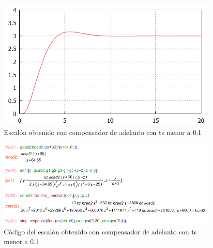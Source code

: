 \documentclass[12pt,letterpaper]{article}
\begin{document}
\begin{figure}[H]
            \centering
            \centerline{\includegraphics[width=125mm]{RLadel3.png}}
            \caption{Escalón obtenido con compensador de adelanto con ts menor a 0.1}
            \label{RLadel3}
\end{figure}

\begin{figure}[H]
            \centering
            \centerline{\includegraphics[width=150mm]{RLadelcode3.png}}
            \caption{Código del escalón obtenido con compensador de adelanto con ts menor a 0.1}
            \label{RLadelcode3}
\end{figure}
\end{document}
